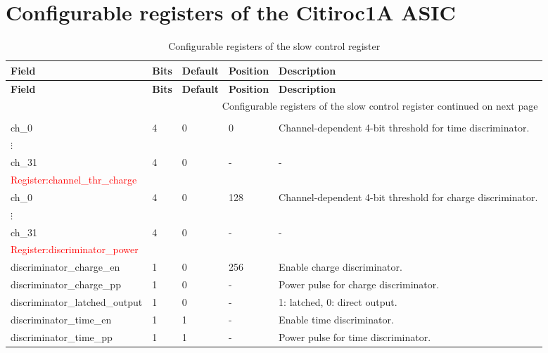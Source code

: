 \chapter{Configurable registers of the Citiroc1A ASIC}\label{cha:Citiroc1A_register}

\begin{longtable}{|p{6cm}|p{1cm}|p{1.4cm}|p{1.8cm}|p{5cm}|}
    
    \caption{Configurable registers of the slow control register\autocite{InternalcommunicationKarl} \label{tab:slow_control_register}} \\ \hline
    \hline
\textbf{Field} & \textbf{Bits} & \textbf{Default} & \textbf{Position} & \textbf{Description} \\ \hline
\endfirsthead

\hline
\textbf{Field} & \textbf{Bits} & \textbf{Default} & \textbf{Position } & \textbf{Description} \\ \hline
\endhead

\hline
\multicolumn{5}{r}{{Configurable registers of the slow control register continued on next page}} \\
\endfoot

\hline
\endlastfoot

\multicolumn{5}{|l|}{\textcolor{red}{Register:channel\_thr\_time}} \\ \hline
ch\_0       & 4  & 0 & 0   & Channel-dependent 4-bit threshold for time discriminator. \\ \hline
 $\vdots$ & &   &  & \\ \hline %
ch\_31      & 4  & 0 & -   & - \\ \hline
\multicolumn{5}{|l|}{\textcolor{red}{Register:channel\_thr\_charge }} \\ \hline
ch\_0     & 4  & 0 & 128 & Channel-dependent 4-bit threshold for charge discriminator. \\ \hline
$\vdots$ & &   &  & \\ \hline %
 ch\_31    & 4  & 0 & -   & - \\ \hline

\multicolumn{5}{|l|}{\textcolor{red}{Register:discriminator\_power}} \\ \hline
discriminator\_charge\_en      & 1  & 0 & 256 & Enable charge discriminator. \\ \hline
discriminator\_charge\_pp      & 1  & 0 & -   & Power pulse for charge discriminator. \\ \hline
discriminator\_latched\_output & 1  & 0 & -   & 1: latched, 0: direct output. \\ \hline
discriminator\_time\_en        & 1  & 1 & -   & Enable time discriminator. \\ \hline
discriminator\_time\_pp        & 1  & 1 & -   & Power pulse for time discriminator. \\ \hline



\end{longtable}
